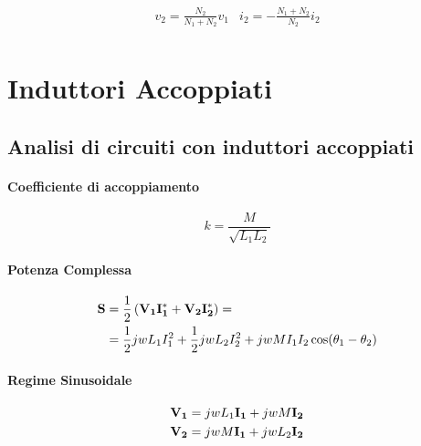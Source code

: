 \begin{align*}
  v_2 = \frac{N_2}{N_1 + N_2} v_1
   & i_2 = - \frac{N_1 + N_2}{N_2} i_2 \\
\end{align*}

\section{Induttori Accoppiati}

\subsection{Analisi di circuiti con induttori accoppiati}

\paragraph{Coefficiente di accoppiamento}

\begin{equation}
  k = \frac{M}{\sqrt{L_1 L_2}}
\end{equation}

\paragraph{Potenza Complessa}

\begin{equation}
  \begin{split}
    \mathbf{S} &= \frac{1}{2} \left(\mathbf{V_1} \mathbf{I_1^*} + \mathbf{V_2} \mathbf{I_2^*}\right) = \\
    &= \frac{1}{2} jw L_1 I_1^2 + \frac{1}{2} jw L_2 I_2^2 + jw M I_1 I_2 \cos(\theta_1 - \theta_2)
  \end{split}
\end{equation}

\paragraph{Regime Sinusoidale}

\begin{equation}
  \begin{split}
    \mathbf{V_1} &= j w L_1 \mathbf{I_1} + j w M \mathbf{I_2} \\
    \mathbf{V_2} &= j w M \mathbf{I_1} + j w L_2 \mathbf{I_2}
  \end{split}
\end{equation}


